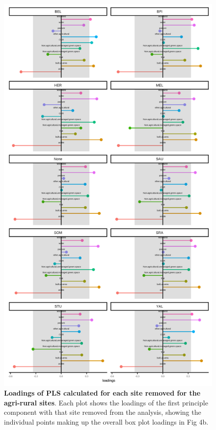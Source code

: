 \documentclass[12pt,letter]{amsart}
\begin{document}
\begin{figure}[h]
	\centering
	\includegraphics{../Results/figures/SI_figures/agrirural_jk_individual_loadings.png}
	\caption{\textbf{Loadings of PLS calculated for each site removed for the agri-rural sites}. Each plot shows the loadings of the first principle component with that site removed from the analysis, showing the individual points making up the overall box plot loadings in Fig 4b.}
\end{figure}
\end{document}
